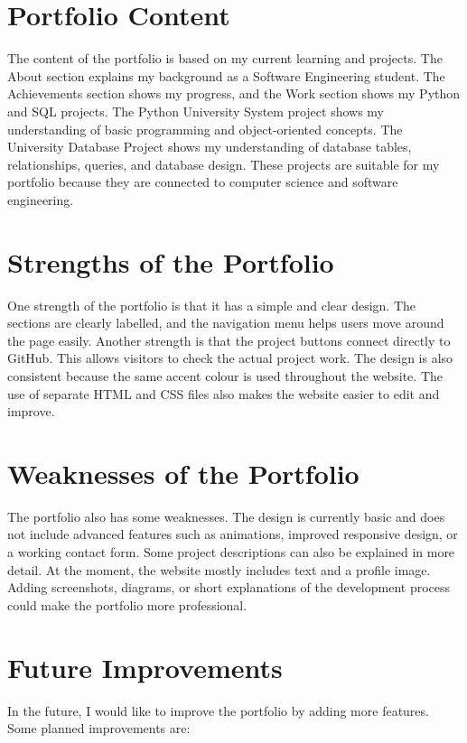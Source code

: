 \documentclass[12pt,a4paper]{article}
\begin{document}
\section{Portfolio Content}

The content of the portfolio is based on my current learning and projects. The About section explains my background as a Software Engineering student. The Achievements section shows my progress, and the Work section shows my Python and SQL projects.
The Python University System project shows my understanding of basic programming and object-oriented concepts. The University Database Project shows my understanding of database tables, relationships, queries, and database design.
These projects are suitable for my portfolio because they are connected to computer science and software engineering.

\section{Strengths of the Portfolio}

One strength of the portfolio is that it has a simple and clear design. The sections are clearly labelled, and the navigation menu helps users move around the page easily.
Another strength is that the project buttons connect directly to GitHub. This allows visitors to check the actual project work.
The design is also consistent because the same accent colour is used throughout the website. The use of separate HTML and CSS files also makes the website easier to edit and improve.

\section{Weaknesses of the Portfolio}

The portfolio also has some weaknesses. The design is currently basic and does not include advanced features such as animations, improved responsive design, or a working contact form.
Some project descriptions can also be explained in more detail. At the moment, the website mostly includes text and a profile image. Adding screenshots, diagrams, or short explanations of the development process could make the portfolio more professional.

\section{Future Improvements}

In the future, I would like to improve the portfolio by adding more features. Some planned improvements are:
\end{document}
